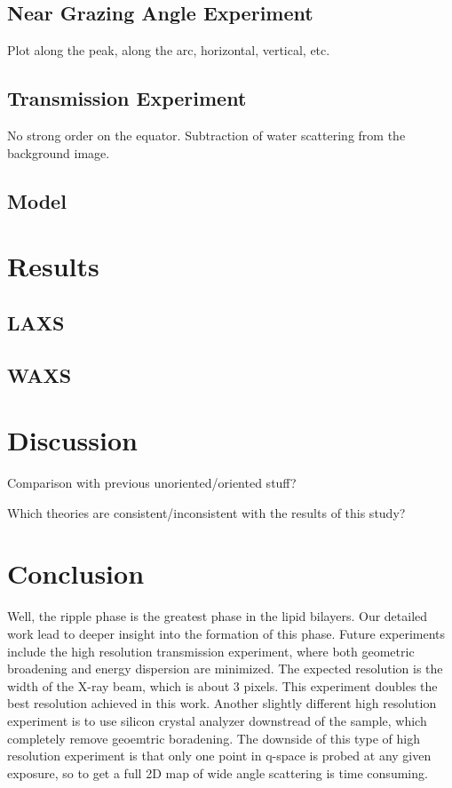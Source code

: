 \subsection{Near Grazing Angle Experiment}
Plot along the peak, along the arc, horizontal, vertical, etc.

\subsection{Transmission Experiment}
No strong order on the equator. Subtraction of water scattering from the
background image.

\subsection{Model}


\section{Results}
\subsection{LAXS}

\subsection{WAXS}

\section{Discussion}
Comparison with previous unoriented/oriented stuff?

Which theories are consistent/inconsistent with the results of this study?


\section{Conclusion}
Well, the ripple phase is the greatest phase in the lipid bilayers. Our detailed
work lead to deeper insight into the formation of this phase. Future experiments
include the high resolution transmission experiment, where both geometric 
broadening and energy dispersion are minimized. The expected resolution 
is the width of the X-ray beam, which is about 3 pixels. This experiment 
doubles the best resolution achieved in this work. 
Another slightly different high resolution experiment is to use silicon 
crystal analyzer downstread of the sample, which completely remove geoemtric
boradening. The downside of this type of high resolution experiment is that
only one point in q-space is probed at any given exposure, so to get a full
2D map of wide angle scattering is time consuming.  
